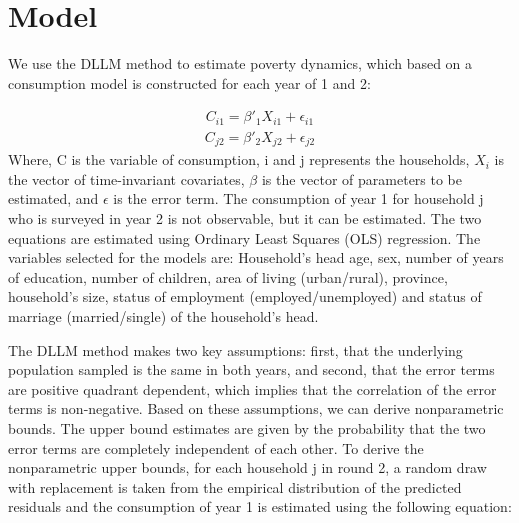 \documentclass[12pt,a4paper]{article}
\begin{document}



\section{Model}
We use the DLLM method to estimate poverty dynamics, which based on  a consumption model is constructed for each  year of 1 and  2:

\begin{align}
	C_{i1} = \beta'_1X_{i1} + \epsilon_{i1}
	\label{eq1}
\end{align}
\begin{align}
	C_{j2} = \beta'_2X_{j2} + \epsilon_{j2}
	\label{eq2}
\end{align}
Where, C is the variable of consumption, i and j represents the households, $X_i$ is the vector of time-invariant covariates, $\beta$ is the vector of parameters to be estimated, and $\epsilon$ is the error term. The consumption of year 1 for household j who is surveyed in year 2 is not observable, but it can be estimated. The two equations are estimated using Ordinary Least Squares (OLS) regression.
The variables selected for the models are: Household’s head age, sex, number of years of education, number of children, area of living (urban/rural), province, household’s size, status of employment (employed/unemployed) and status of marriage (married/single) of the household's head.

The DLLM method makes two key assumptions: first, that the underlying population sampled is the same in both years, and second, that the error terms are positive quadrant dependent, which implies that the correlation of the error terms is non-negative. Based on these assumptions, we can derive nonparametric bounds. The upper bound estimates are given by the probability that the two error terms are completely independent of each other. To derive the nonparametric upper bounds, for each household j in round 2, a random draw with replacement is taken from the empirical distribution of the predicted residuals and the consumption of year 1 is estimated using the following equation:
	 
\end{document}
